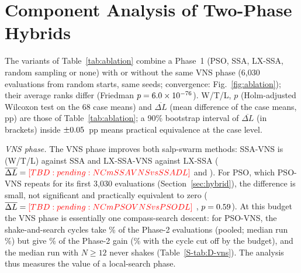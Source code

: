 \section{Component Analysis of Two-Phase Hybrids}
\label{sec:ablation}


The variants of Table~\ref{tab:ablation} combine a Phase~1 (PSO, SSA, LX-SSA, random sampling or none) with or without the same VNS phase (6,030 evaluations from random starts, same seeds; convergence: Fig.~\ref{fig:ablation}); their average ranks differ (Friedman $p=6.0\times10^{-76}$). W/T/L, $p$ (Holm-adjusted Wilcoxon test on the 68 case means) and $\overline{\Delta L}$ (mean difference of the case means, pp) are those of Table~\ref{tab:ablation}; a 90\% bootstrap interval of $\overline{\Delta L}$ (in brackets) inside $\pm0.05$~pp means practical equivalence at the case level.

\emph{VNS phase.} The VNS phase improves both salp-swarm methods: SSA-VNS is \NAblSSAVNSvsSSA{} (W/T/L) against SSA and LX-SSA-VNS \NAblLXSSAVNSvsLXSSA{} against LX-SSA ($\overline{\Delta L}=\NCmSSAVNSvsSSADL$ and \NCmLXSSAVNSvsLXSSADL). For PSO, which PSO-VNS repeats for its first 3,030 evaluations (Section~\ref{sec:hybrid}), the difference is small, not significant and practically equivalent to zero ($\overline{\Delta L}=\NCmPSOVNSvsPSODL$ \NEqPSOVNSvsPSOCI, $p=0.59$). At this budget the VNS phase is essentially one compass-search descent: for PSO-VNS, the shake-and-search cycles take \NDCycleEvalsPctPSOVNS\% of the Phase-2 evaluations (pooled; median run \NDCycleEvalsPctMedianPSOVNS\%) but give \NDCycleSharePSOVNS\% of the Phase-2 gain (\NDCycleAllSharePSOVNS\% with the cycle cut off by the budget), and the median run with $N\ge12$ never shakes (Table~\ref{S-tab:D-vns}). The analysis thus measures the value of a local-search phase.

